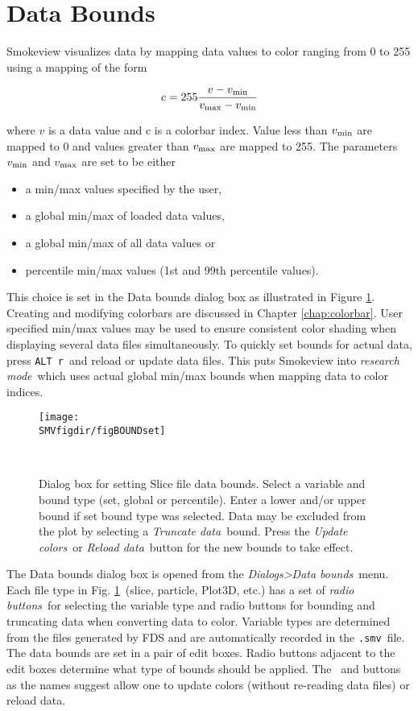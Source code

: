 \documentclass[11pt,twoside]{book}
\newcommand{\frameit}[1]{\fbox{\tt #1}}
\begin{document}
\section{Data Bounds}

Smokeview visualizes data by mapping data values to color
ranging from 0 to 255 using a mapping of the form

\begin{eqnarray*}
c=255 \frac{v-v_{\rm min}}{v_{\rm max}-v_{\rm min}}
\end{eqnarray*}

\noindent where $v$ is a data value and c is a colorbar index.
Value less than $v_{\rm min}$ are mapped to 0 and
values greater than $v_{\rm max}$ are mapped to 255.
The parameters $v_{\rm min}$ and $v_{\rm max}$ are set to be either
\begin{itemize}
\item a min/max values specified by the user,
\item a global min/max of loaded data values,
\item a global min/max of all data values or
\item percentile min/max values (1st and 99th percentile values).
\end{itemize}
This choice is set in the Data bounds dialog box as illustrated in Figure \ref{figBOUNDSset}.
Creating and modifying colorbars are discussed in Chapter \ref{chap:colorbar}.
User specified min/max values may be used to ensure consistent color shading when
displaying several data files simultaneously.
To quickly set bounds for actual data, press {\tt ALT r}\ and reload or update data files.
This puts Smokeview into {\em research mode}\ which uses actual global min/max bounds
when mapping data to color indices.

\begin{figure}[bph]
\centerline{
\texttt{[image: \\SMVfigdir/figBOUNDset]}}
\caption[Dialog box for setting Slice file data bounds.]
{Dialog box for setting Slice file data bounds.
Select a variable and bound type (set, global  or percentile).  Enter a lower
and/or upper bound if set bound type was selected. Data may be excluded from the plot by
selecting a {\em Truncate data}\ bound.
Press the {\em Update colors}\ or {\em Reload data}\ button for
the new bounds to take effect.}\ \label{figBOUNDSset}
\end{figure}


The Data bounds dialog box is opened from the {\em
Dialogs>Data bounds}\ menu. Each file type in Fig. \ref{figBOUNDSset}\
(slice, particle, Plot3D, etc.) has a set of {\em radio buttons}\
for selecting the variable type and radio buttons for bounding and truncating
data when converting data to color. Variable types are determined from the files generated
by FDS and are automatically recorded in the {\tt .smv}\ file. The
data bounds are set in a pair of edit boxes. Radio buttons
adjacent to the edit boxes determine what type of bounds should be
applied.
The \frameit{Update Colors}\ and \frameit{Reload Data} buttons
as the names suggest allow one to update colors (without re-reading data files) or reload data.
\end{document}
